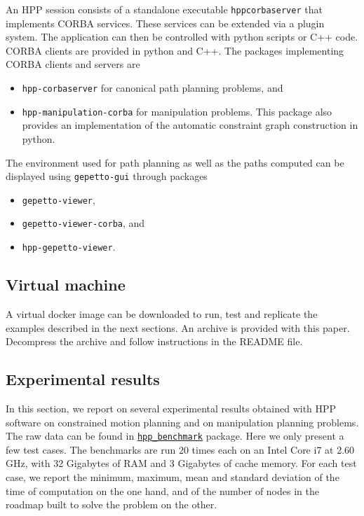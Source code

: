 An HPP session consists of a standalone executable \texttt{hppcorbaserver}
that implements CORBA services. These services can be extended via a plugin
system. The application can then be controlled with python scripts or C++ code.
CORBA clients are provided in python and C++. The packages implementing CORBA
clients and servers are
\begin{itemize}
\item \texttt{hpp-corbaserver} for canonical path planning problems, and
\item \texttt{hpp-manipulation-corba} for manipulation problems. This
package also provides an implementation of the automatic constraint graph
construction in python.
\end{itemize}
The environment used for path planning as well as the paths computed can be
displayed using \texttt{gepetto-gui} through packages
\begin{itemize}
  \item\texttt{gepetto-viewer},
  \item\texttt{gepetto-viewer-corba}, and
  \item\texttt{hpp-gepetto-viewer}.
\end{itemize}

\subsection{Virtual machine}

A virtual docker image can be downloaded to run, test and replicate the
examples described in the next sections. An archive is provided with this paper.
Decompress the archive and follow instructions in the README file.

\subsection{Experimental results}\label{sec:benchmarks}

In this section, we report on several experimental results obtained
with HPP software on constrained motion planning and on manipulation
planning problems. The raw data can be found in
\href{https://github.com/humanoid-path-planner/hpp_benchmark/tree/v4.10.0/2020-07-23}{\texttt{hpp\_benchmark}} package. Here we only present a few test cases.
The benchmarks are run 20 times each on an Intel Core i7 at 2.60 GHz, with {\color{blue}32 Gigabytes of RAM and 3 Gigabytes of cache memory}. For each test case, we report the minimum, maximum, mean and standard deviation of the time of computation on the one hand, and of the number of nodes in the roadmap built to solve the problem on the other.

